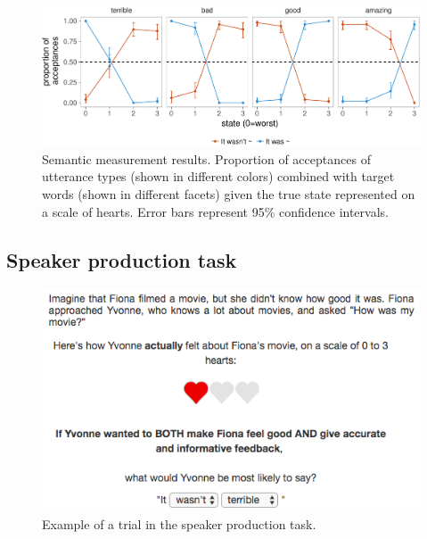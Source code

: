 \documentclass[floatsintext,man]{apa6}
\theoremstyle{definition}
\theoremstyle{definition}
\theoremstyle{definition}
\theoremstyle{remark}
\begin{document}
\begin{figure}[!h]
\includegraphics[width=\textwidth]{polite_NHB_files/figure-latex/litsem-1} \caption{Semantic measurement results. Proportion of acceptances of utterance types (shown in different colors) combined with target words (shown in different facets) given the true state represented on a scale of hearts. Error bars represent 95\% confidence intervals.}\label{fig:litsem}
\end{figure}

\subsection{Speaker production task}\label{speaker-production-task}

\begin{figure}[!h]
\includegraphics[width=\textwidth]{fig/screenshot} \caption{Example of a trial in the speaker production task.}\label{fig:screenshot}
\end{figure}
\end{document}
